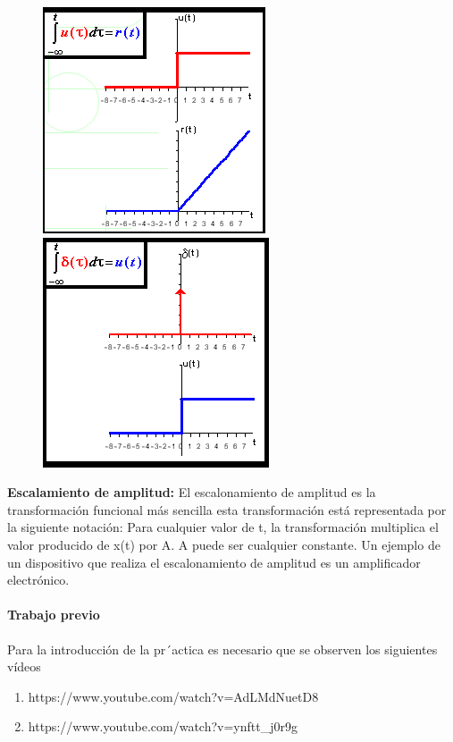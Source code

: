 \begin{figure}[h]
	\includegraphics[scale=0.55]{1}
	\includegraphics[scale=0.55]{2}
	\centering
\end{figure}

\textbf{Escalamiento de amplitud:}
El escalonamiento de amplitud es la transformación funcional más sencilla esta transformación está representada por la siguiente notación: 
Para cualquier valor de t, la transformación multiplica el valor producido de x(t) por A. 
A puede ser cualquier constante.
Un ejemplo de un dispositivo que realiza el escalonamiento de amplitud es un amplificador electrónico.

\paragraph*{Trabajo previo}

Para la introducción de la pr´actica es necesario que se observen los siguientes vídeos

\begin{enumerate}
	\item https://www.youtube.com/watch?v=AdLMdNuetD8
	\item https://www.youtube.com/watch?v=ynftt\_j0r9g
\end{enumerate}

